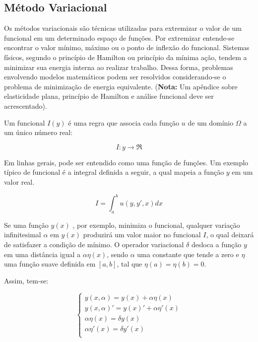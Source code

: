 \subsection{Método Variacional}
Os métodos variacionais são técnicas utilizadas para extremizar o valor de um funcional em um determinado espaço de funções. Por extremizar entende-se encontrar o valor mínimo, máximo ou o ponto de inflexão do funcional.
Sistemas físicos, segundo o princípio de Hamilton ou princípio da mínima ação, tendem a minimizar sua energia interna ao realizar trabalho. Dessa forma, problemas envolvendo modelos matemáticos podem ser resolvidos considerando-se o problema de minimização de energia equivalente. (\textbf{Nota:} Um apêndice sobre elasticidade plana, princípio de Hamilton e análise funcional deve ser acrescentado).

Um funcional $ I(y) $ é uma regra que associa cada função $ u $ de um domínio $ \Omega $ a um único número real:

\begin{equation}
I : y \rightarrow \Re
\end{equation}

Em linhas gerais, pode ser entendido como uma função de funções. Um exemplo típico de funcional é a integral definida a seguir, a qual mapeia a função $ y $ em um valor real.

\begin{equation}
\label{eq:funcional}
I = \int_{a}^{b} u(y, y', x) dx
\end{equation}

Se uma função $ y(x) $ , por exemplo, minimiza o funcional, qualquer variação infinitesimal $ \alpha $ em $ y(x) $ produzirá um valor maior no funcional $ I $, o qual deixará de satisfazer a condição de mínimo. O operador variacional $ \delta $ desloca a função $ y $ em uma distância igual a $ \alpha \eta(x) $, sendo $ \alpha $ uma constante que tende a zero e $ \eta $ uma função suave definida em $[a,b]$, tal que $\eta(a) = \eta(b) = 0$.

Assim, tem-se: 

\begin{equation}
	\label{eq:sisEta}
	\begin{cases}
        y(x, \alpha) = y(x) + \alpha \eta(x) \\
        y(x, \alpha)' = y(x)' + \alpha \eta'(x) \\
		\alpha \eta(x) = \delta y(x) \\   
		\alpha \eta'(x) = \delta y'(x) \\  
    \end{cases}
\end{equation}

